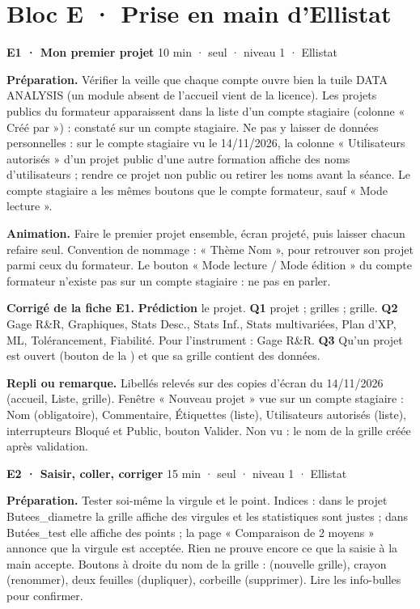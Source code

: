 \section*{Bloc E · Prise en main d'Ellistat}
\begin{tcolorbox}[act]\textbf{E1 · Mon premier projet} \hfill {\small 10 min · seul · niveau 1 · Ellistat}\end{tcolorbox}
\textbf{Préparation.} Vérifier la veille que chaque compte ouvre bien la tuile DATA ANALYSIS (un module absent de l'accueil vient de la licence). Les projets publics du formateur apparaissent dans la liste d'un compte stagiaire (colonne « Créé par ») : constaté sur un compte stagiaire. Ne pas y laisser de données personnelles : sur le compte stagiaire vu le 14/11/2026, la colonne « Utilisateurs autorisés » d'un projet public d'une autre formation affiche des noms d'utilisateurs ; rendre ce projet non public ou retirer les noms avant la séance. Le compte stagiaire a les mêmes boutons que le compte formateur, sauf « Mode lecture ».\par
\textbf{Animation.} Faire le premier projet ensemble, écran projeté, puis laisser chacun refaire seul. Convention de nommage : « Thème Nom », pour retrouver son projet parmi ceux du formateur. Le bouton « Mode lecture / Mode édition » du compte formateur n'existe pas sur un compte stagiaire : ne pas en parler.\par
\textbf{\color{ok}Corrigé de la fiche E1.} \textbf{Prédiction} le projet. \textbf{Q1} projet ; grilles ; grille. \textbf{Q2} Gage R\&R, Graphiques, Stats Desc., Stats Inf., Stats multivariées, Plan d'XP, ML, Tolérancement, Fiabilité. Pour l'instrument : Gage R\&R. \textbf{Q3} Qu'un projet est ouvert (bouton  de la ) et que sa grille contient des données.\par
{\small\textbf{Repli ou remarque.} Libellés relevés sur des copies d'écran du 14/11/2026 (accueil, Liste, grille). Fenêtre « Nouveau projet » vue sur un compte stagiaire : Nom (obligatoire), Commentaire, Étiquettes (liste), Utilisateurs autorisés (liste), interrupteurs Bloqué et Public, bouton Valider. Non vu : le nom de la grille créée après validation.}\par
\vspace{3pt}
\begin{tcolorbox}[act]\textbf{E2 · Saisir, coller, corriger} \hfill {\small 15 min · seul · niveau 1 · Ellistat}\end{tcolorbox}
\textbf{Préparation.} Tester soi-même la virgule et le point. Indices : dans le projet Butees\_diametre la grille affiche des virgules et les statistiques sont justes ; dans Butées\_test elle affiche des points ; la page « Comparaison de 2 moyens » annonce que la virgule est acceptée. Rien ne prouve encore ce que la saisie à la main accepte. Boutons à droite du nom de la grille : \menu{+} (nouvelle grille), crayon (renommer), deux feuilles (dupliquer), corbeille (supprimer). Lire les info-bulles pour confirmer.\par
